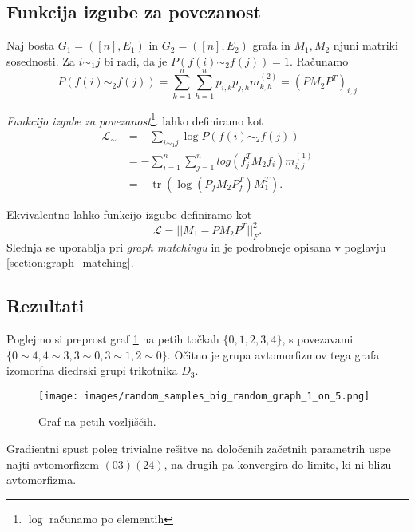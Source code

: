 \documentclass[mat2, tisk]{fmfdelo}
\newcommand{\loss }{\mathcal L}
\begin{document}
            \subsection{Funkcija izgube za povezanost}
            Naj bosta $G_1 = ([n], E_1)$ in $G_2 = ([n], E_2)$ grafa
            in $M_1, M_2$ njuni matriki sosednosti.
            Za $i \sim_1 j$ bi radi, da je $P(f(i)  \sim_2 f(j)) = 1$.
            Računamo
            $$
            P(f(i) \sim_2 f(j)) = \sum_{k= 1}^n \sum_{h = 1}^n p_{i,
            k} p_{j, h} m_{k,h}^{(2)}
            = (P M_2 P^T)_{i, j}
            $$
            \begin{definicija}
              \emph{Funkcijo izgube za povezanost}\footnote{$\log$
              računamo po elementih}. lahko definiramo kot
              \begin{align*}
                \mathcal{L}_\sim &= -\sum_{i \sim_1 j} \log P(f(i) \sim_2 f(j))
                \\&= -\sum_{i=1}^n\sum_{j=1}^n log(f_j^T M_2
                f_i)m_{i,j}^{(1)}\\&=
                -\operatorname{tr}(\log(P_fM_2P_f^T) M_1^T).
              \end{align*}
            \end{definicija}

            \begin{opomba}
              \label{opomba:loss_function_qap}
              Ekvivalentno lahko funkcijo izgube definiramo kot
              $$
              \loss = ||M_1 - PM_2P^T ||_F^2.
              $$
              Slednja se uporablja pri \emph{graph matchingu} in je
              podrobneje opisana v poglavju \ref{section:graph_matching}.
            \end{opomba}
            \subsection{Rezultati}
            \begin{primer}
              Poglejmo si preprost graf \ref{fig:primer_grafa} na
              petih točkah $\{0,1,2,3,4\}$, s povezavami $\{0 \sim 4,
              4 \sim 3, 3 \sim 0, 3 \sim 1, 2 \sim 0\}$. Očitno je
              grupa avtomorfizmov tega grafa izomorfna diedrski grupi
              trikotnika $D_3$.
              \begin{figure}[h!]
                \centering
                \texttt{[image: images/random\_samples\_big\_random\_graph\_1\_on\_5.png]}
                \caption{Graf na petih vozljiščih.}
                \label{fig:primer_grafa}
              \end{figure}
              Gradientni spust poleg trivialne rešitve na določenih
              začetnih parametrih uspe najti avtomorfizem $(03)(24)$,
              na drugih pa konvergira do limite, ki ni blizu avtomorfizma.

            \end{primer}
\end{document}
